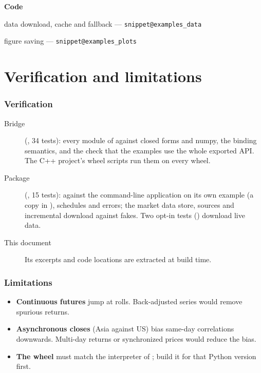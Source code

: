 \documentclass[11pt,a4paper]{article}
\makeatletter
\newcommand{\snippetsource}[1]{\csname snippet@#1\endcsname}
\newcommand{\snippet}[3]{%
  }
\newenvironment{codepointers}{%
  \par\smallskip\begingroup\footnotesize\noindent\textcolor{blue!50!black}{\textbf{Code}}\par\nopagebreak
  \begin{list}{}{\setlength{\leftmargin}{1.2em}\setlength{\itemsep}{0pt}\setlength{\parsep}{0pt}\setlength{\topsep}{1pt}}}%
  {\end{list}\endgroup\smallskip}
\newcommand{\codeitem}[2]{\item #2 --- \texttt{\snippetsource{#1}}}
\makeatother
\begin{document}
\snippet{examples_coverage}{Python}{Every exported name must appear in an example}
\begin{codepointers}
  \codeitem{examples_data}{data download, cache and fallback}
  \codeitem{examples_plots}{figure saving}
\end{codepointers}


\part{Verification and limitations}

\section{Verification}\label{sec:verification}
\begin{description}
  \item[Bridge] (, 34 tests): every module of 
        against closed forms and numpy, the binding semantics, and the check that the examples
        use the whole exported API. The C++ project's wheel scripts run them on every wheel.
  \item[Package] (, 15 tests):  against the command-line
        application on its own example (a copy in ), schedules and errors; the
        market data store, sources and incremental download against fakes. Two opt-in tests
        () download live data.
  \item[This document] Its excerpts and code locations are extracted at build time.
\end{description}

\section{Limitations}\label{sec:limitations}
\begin{itemize}
  \item \textbf{Continuous futures} jump at rolls. Back-adjusted series would remove
        spurious returns.
  \item \textbf{Asynchronous closes} (Asia against US) bias same-day correlations downwards.
        Multi-day returns or synchronized prices would reduce the bias.
  \item \textbf{The wheel} must match the interpreter of ; build it for that Python
        version first.
\end{itemize}
\end{document}
